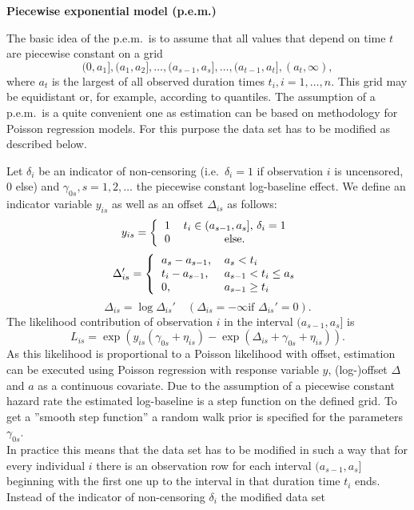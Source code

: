 \documentclass[11pt,a4paper,twoside]{bayesxarticle}
\begin{document}
\textbf{Piecewise exponential model (p.e.m.)}

The basic idea of the p.e.m.~is to assume that all values that
depend on time $t$ are piecewise constant on a grid
\[
(0,a_1],(a_1,a_2],\ldots,(a_{s-1},a_s],\ldots,(a_{t-1},a_t],(a_t,\infty),
\]
where $a_t$ is the largest of all observed duration times
$t_i,i=1,\ldots,n$. This grid may be equidistant or, for example,
according to quantiles. The assumption of a p.e.m.~is a quite
convenient one as estimation can be based on methodology for
Poisson regression models. For this purpose the data set has to be
modified as described below.

Let $\delta_i$ be an indicator of non-censoring (i.e.~$\delta_i=1$
if observation $i$ is uncensored, 0 else) and
$\gamma_{0s},s=1,2,\ldots$ the piecewise constant log-baseline
effect. We define an indicator variable $y_{is}$ as well as an
offset $\Delta_{is}$ as follows:
\[
y_{is}=\left\{
 \begin{tabular}{cc}
1 & $t_i\in (a_{s-1},a_s]$, $\delta_i=1$\\0 & else.
 \end{tabular}
 \right.
\]
\vspace{0.05cm}
\[
\Delta_{is}'=\left\{\begin{tabular}{ll} $a_s-a_{s-1}$,&$a_s<t_i$ \\ $t_i-a_{s-1}$,&$a_{s-1}<t_i\le a_s$ \\
0, &$a_{s-1}\ge t_i$
\end{tabular}\right.
\]
\[
\Delta_{is}=\log{\Delta_{is}'} \quad (\Delta_{is}=-\infty \textrm{
if } \Delta_{is}'=0).
\]
The likelihood contribution of observation $i$ in the interval
$(a_{s-1},a_s]$ is
\[
L_{is}=\exp\left(y_{is}(\gamma_{0s}+\eta_{is})-\exp(\Delta_{is}+\gamma_{0s}+\eta_{is})\right).
\]
As this likelihood is proportional to a Poisson likelihood with
offset, estimation can be executed using Poisson regression with
response variable $y$, (log-)offset $\Delta$ and $a$ as a
continuous covariate. Due to the assumption of a piecewise
constant hazard rate the estimated log-baseline is a step function
on the defined grid. To get a ''smooth step function'' a random
walk prior is specified
for the parameters $\gamma_{0s}$.\\
In practice this means that the data set has to be modified in
such a way that for every individual $i$ there is an observation
row for each interval $(a_{s-1},a_s]$ beginning with the first one
up to the interval in that duration time $t_i$ ends. Instead of
the indicator of non-censoring $\delta_i$ the modified data set
\end{document}
